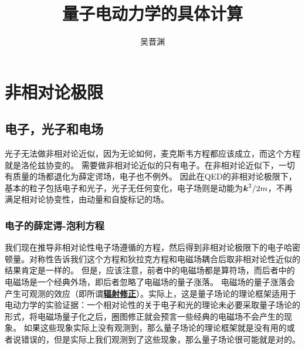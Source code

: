 \documentclass[hyperref, UTF8, a4paper]{ctexart}
\title{量子电动力学的具体计算}
\author{吴晋渊}
\newcommand{\concept}[1]{\underline{\textbf{#1}}}
\begin{document}
\maketitle

\section{非相对论极限}

\subsection{电子，光子和电场}

光子无法做非相对论近似，因为无论如何，麦克斯韦方程都应该成立，而这个方程就是洛伦兹协变的。
需要做非相对论近似的只有电子。在非相对论近似下，一切有质量的场都退化为薛定谔场，电子也不例外。
因此在QED的非相对论极限下，基本的粒子包括电子和光子，光子无任何变化，电子场则是动能为$\vb*{k}^2 / 2m$，不再满足相对论协变性，由动量和自旋标记的场。

\subsubsection{电子的薛定谔-泡利方程}

我们现在推导非相对论性电子场遵循的方程，然后得到非相对论极限下的电子哈密顿量。对称性告诉我们这个方程和狄拉克方程和电磁场耦合后取非相对论性近似的结果肯定是一样的。
但是，应该注意，前者中的电磁场都是算符场，而后者中的电磁场是一个经典外场，即后者忽略了电磁场的量子涨落。
电磁场的量子涨落会产生可观测的效应（即所谓\concept{辐射修正}）。实际上，这是量子场论的理论框架适用于电动力学的实验证据：一个相对论性的关于电子和光的理论未必要采取量子场论的形式，将电磁场量子化之后，圈图修正就会预言一些经典的电磁场不会产生的现象。
如果这些现象实际上没有观测到，那么量子场论的理论框架就是没有用的或者说错误的，但是实际上我们观测到了这些现象，那么量子场论很可能就是对的。
\end{document}
